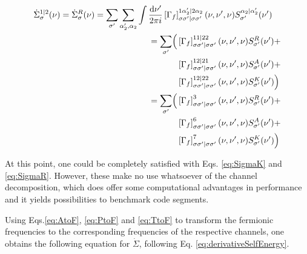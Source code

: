 \documentclass[12pt,a4paper,roman]{article}
\newcommand{\dd}{\mathrm{d}}
\begin{document}
\begin{align}
\begin{split}
\dot{\Sigma}^{1|2}_\sigma(\nu) =\dot{\Sigma}^R_\sigma(\nu) = \sum_{\sigma'}&\sum_{\alpha_2', \alpha_2}\int \frac{\dd\nu'}{2\pi i} \left[\Gamma_f\right]_{\sigma\sigma'|\sigma\sigma'}^{1\alpha_2'|2\alpha_2}(\nu, \nu', \nu)S^{\alpha_2|\alpha_2'}_{\sigma'}(\nu')
\end{split}\\
\begin{split}
= \sum_{\sigma'} \Bigl(
&\left[\Gamma_f\right]_{\sigma\sigma'|\sigma\sigma'}^{11|22}(\nu, \nu', \nu)S^R_{\sigma'}(\nu') +\\
&\left[\Gamma_f\right]_{\sigma\sigma'|\sigma\sigma'}^{12|21}(\nu, \nu', \nu)S^A_{\sigma'}(\nu') +\\
& \left[\Gamma_f\right]_{\sigma\sigma'|\sigma\sigma'}^{12|22}(\nu, \nu', \nu)S^K_{\sigma'}(\nu')\Bigr)
\end{split}\\
\begin{split}
= \sum_{\sigma'} \Bigl(
&\left[\Gamma_f\right]_{\sigma\sigma'|\sigma\sigma'}^{3}(\nu, \nu', \nu)S^R_{\sigma'}(\nu') +\\
&\left[\Gamma_f\right]_{\sigma\sigma'|\sigma\sigma'}^{6}(\nu, \nu', \nu)S^A_{\sigma'}(\nu') +\\
& \left[\Gamma_f\right]_{\sigma\sigma'|\sigma\sigma'}^{7}(\nu, \nu', \nu)S^K_{\sigma'}(\nu')\Bigr)
\end{split}
\label{eq:SigmaR}
\end{align}

At this point, one could be completely satisfied with Eqs. \eqref{eq:SigmaK} and \eqref{eq:SigmaR}. However, these make no use whatsoever of the channel decomposition, which does offer some computational advantages in performance and it yields possibilities to benchmark code segments.

Using Eqs.\eqref{eq:AtoF}, \eqref{eq:PtoF} and \eqref{eq:TtoF} to transform the fermionic frequencies to the corresponding frequencies of the respective channels, one obtains the following equation for $\dot{\Sigma}$, following Eq. \eqref{eq:derivativeSelfEnergy}.
\end{document}
